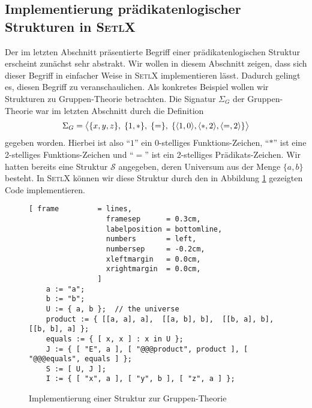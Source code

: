 \subsection{Implementierung pr\"{a}dikatenlogischer Strukturen in \textsc{SetlX}}
Der im letzten Abschnitt pr\"{a}sentierte Begriff einer pr\"{a}dikatenlogischen Struktur erscheint zun\"{a}chst
sehr abstrakt.  Wir wollen in diesem Abschnitt zeigen, dass sich dieser Begriff in einfacher Weise in
\textsc{SetlX} implementieren l\"{a}sst.  Dadurch gelingt es, diesen Begriff zu veranschaulichen.  Als konkretes
Beispiel wollen wir Strukturen zu Gruppen-Theorie betrachten.  Die Signatur $\Sigma_G$ der
Gruppen-Theorie war im letzten Abschnitt durch die Definition
\[ \Sigma_G = 
   \bigl\langle \{x,y,z\},\; \{1,*\},\; \{=\},\; \{ \pair(1,0), \pair(*,2), \pair(=,2) \} \bigr\rangle 
\]
gegeben worden.  Hierbei ist also ``$1$'' ein 0-stelliges Funktions-Zeichen, ``$*$'' ist
eine 2-stelliges Funktions-Zeichen und ``$=$'' ist ein 2-stelliges Pr\"{a}dikats-Zeichen.
Wir hatten bereits eine Struktur $\mathcal{S}$ angegeben, deren Universum aus der Menge
$\{ a, b \}$ besteht.  In \textsc{SetlX} k\"{o}nnen wir diese Struktur durch den in Abbildung
\ref{fig:gruppen.stl} gezeigten Code implementieren.

\begin{figure}[!ht]
\centering
\begin{Verbatim}[ frame         = lines, 
                  framesep      = 0.3cm, 
                  labelposition = bottomline,
                  numbers       = left,
                  numbersep     = -0.2cm,
                  xleftmargin   = 0.0cm,
                  xrightmargin  = 0.0cm,
                ]
    a := "a";
    b := "b"; 
    U := { a, b };  // the universe
    product := { [[a, a], a],  [[a, b], b],  [[b, a], b],  [[b, b], a] };
    equals := { [ x, x ] : x in U };
    J := { [ "E", a ], [ "@@@product", product ], [ "@@@equals", equals ] };
    S := [ U, J ];
    I := { [ "x", a ], [ "y", b ], [ "z", a ] }; 
\end{Verbatim}
\vspace*{-0.3cm}
\caption{Implementierung einer Struktur zur Gruppen-Theorie}
\label{fig:gruppen.stl}
\end{figure}

